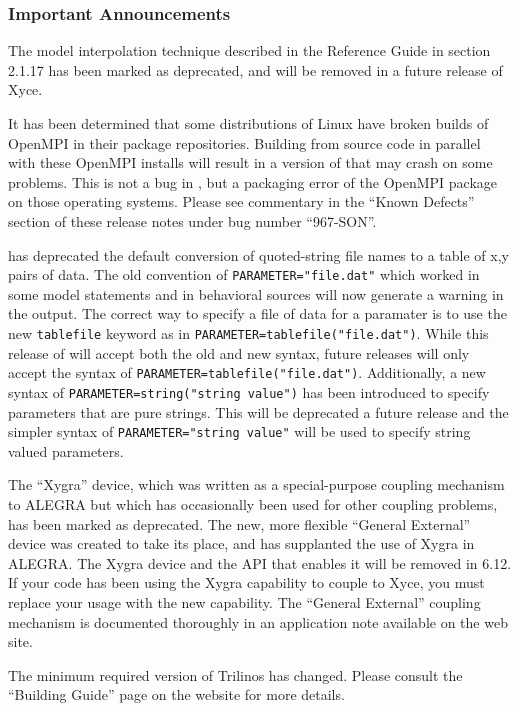 \documentclass[letterpaper]{scrartcl}
\begin{document}
\subsubsection*{Important Announcements}
\begin{XyceItemize}
\item The model interpolation technique described in the \Xyce{}
  Reference Guide in section 2.1.17 has been marked as deprecated, and
  will be removed in a future release of Xyce.
\item It has been determined that some distributions of Linux have
  broken builds of OpenMPI in their package repositories.  Building
  \Xyce{} from source code in parallel with these OpenMPI installs
  will result in a version of \Xyce{} that may crash on some problems.
  This is not a bug in \Xyce{}, but a packaging error of the OpenMPI
  package on those operating systems.  Please see commentary in the
  ``Known Defects'' section of these release notes under bug number
  ``967-SON''.
\item \Xyce{} has deprecated the default conversion of quoted-string file
  names to a table of x,y pairs of data.  The old convention of
  \texttt{PARAMETER="file.dat"} which worked in some model statements
  and in behavioral sources will now generate a warning in the \Xyce{}
  output.  The correct way to specify a file of data for a paramater
  is to use the new \texttt{tablefile} keyword as in
  \texttt{PARAMETER=tablefile("file.dat")}.  While this release of
  \Xyce{} will accept both the old and new syntax, future releases
  will only accept the syntax of
  \texttt{PARAMETER=tablefile("file.dat")}.  Additionally, a new
  syntax of \texttt{PARAMETER=string("string value")} has been
  introduced to specify parameters that are pure strings.  This will
  be deprecated a future release and the simpler syntax of
  \texttt{PARAMETER="string value"} will be used to specify string
  valued parameters.
\item The ``Xygra'' device, which was written as a special-purpose
  coupling mechanism to ALEGRA but which has occasionally been used
  for other coupling problems, has been marked as deprecated.  The
  new, more flexible ``General External'' device was created to take
  its place, and has supplanted the use of Xygra in ALEGRA.  The Xygra
  device and the API that enables it will be removed in \Xyce{} 6.12.
  If your code has been using the Xygra capability to couple to Xyce,
  you must replace your usage with the new capability.  The ``General
  External'' coupling mechanism is documented thoroughly in an
  application note available on the \Xyce{} web site.
\item The minimum required version of Trilinos has changed.  Please
consult the ``Building Guide'' page on the \Xyce{} website for more
details.
\end{XyceItemize}
\end{document}
